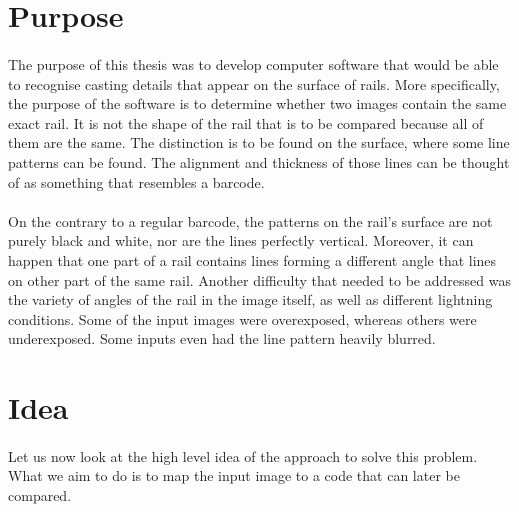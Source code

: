 \section{Purpose}
\paragraph{}
The purpose of this thesis was to develop computer software that would be able to recognise casting details that appear on the surface of rails. More specifically, the purpose of the software is to determine whether two images contain the same exact rail. It is not the shape of the rail that is to be compared because all of them are the same. The distinction is to be found on the surface, where some line patterns can be found. The alignment and thickness of those lines can be thought of as something that resembles a barcode. 
\paragraph{}
On the contrary to a regular barcode, the patterns on the rail's surface are not purely black and white, nor are the lines perfectly vertical. Moreover, it can happen that one part of a rail contains lines forming a different angle that lines on other part of the same rail. Another difficulty that needed to be addressed was the variety of angles of the rail in the image itself, as well as different lightning conditions. Some of the input images were overexposed, whereas others were underexposed. Some inputs even had the line pattern heavily blurred. 

\section{Idea}
\paragraph{}
Let us now look at the high level idea of the approach to solve this problem. What we aim to do is to map the input image to a code that can later be compared.

